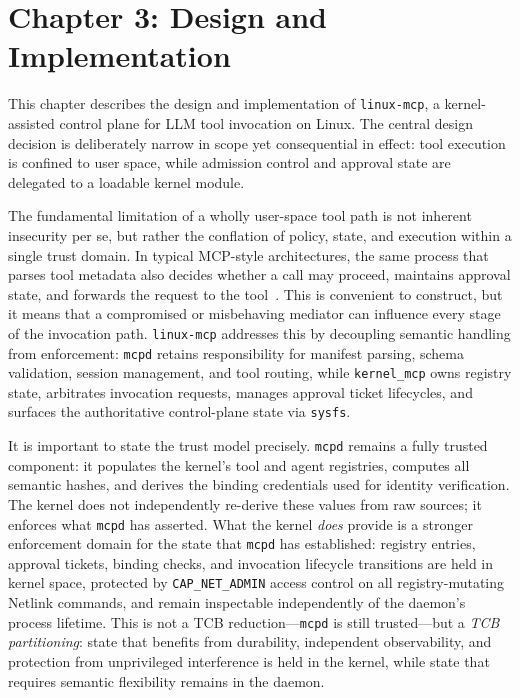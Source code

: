\section*{Chapter 3: Design and Implementation}
 \setcounter{section}{3} \setcounter{subsection}{0}

This chapter describes the design and implementation of \texttt{linux-mcp}, a kernel-assisted control plane for LLM tool invocation on Linux.
The central design decision is deliberately narrow in scope yet consequential in effect: tool execution is confined to user space, while admission control and approval state are delegated to a loadable kernel module.

The fundamental limitation of a wholly user-space tool path is not inherent insecurity per se, but rather the conflation of policy, state, and execution within a single trust domain.
In typical MCP-style architectures, the same process that parses tool metadata also decides whether a call may proceed, maintains approval state, and forwards the request to the tool~\cite{mickens2019nightwatch}.
This is convenient to construct, but it means that a compromised or misbehaving mediator can influence every stage of the invocation path.
\texttt{linux-mcp} addresses this by decoupling semantic handling from enforcement: \texttt{mcpd} retains responsibility for manifest parsing, schema validation, session management, and tool routing, while
\texttt{kernel\_mcp} owns registry state, arbitrates invocation requests, manages approval ticket lifecycles, and surfaces the authoritative control-plane state via \texttt{sysfs}.

It is important to state the trust model precisely.
\texttt{mcpd} remains a fully trusted component: it populates the kernel's tool and agent registries, computes all semantic hashes, and derives the binding credentials used for identity verification.
The kernel does not independently re-derive these values from raw sources; it enforces what \texttt{mcpd} has asserted.
What the kernel \emph{does} provide is a stronger enforcement domain for the state that \texttt{mcpd} has established: registry entries, approval tickets, binding checks, and invocation lifecycle transitions are held in kernel space, protected by \texttt{CAP\_NET\_ADMIN} access control on all registry-mutating Netlink commands, and remain inspectable independently of the daemon's process lifetime.
This is not a TCB reduction---\texttt{mcpd} is still trusted---but a \emph{TCB partitioning}: state that benefits from durability, independent observability, and protection from unprivileged interference is held in the kernel, while state that requires semantic flexibility remains in the daemon.



